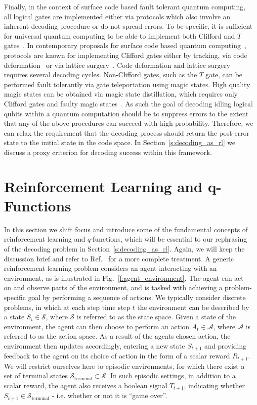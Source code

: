 \documentclass[twocolumn,preprintnumbers,amsmath,amssymb,notitlepage,nofootinbib,longbibliography,superscriptaddress,aps,pra,10pt]{revtex4-1}
\begin{document}
	Finally, in the context of surface code based fault tolerant quantum computing, all logical gates are implemented either via protocols which also involve an inherent decoding procedure or do not spread errors.
	To be specific, it is sufficient for universal quantum computing to be able to implement both Clifford and $T$ gates~\cite{Nebe01,Bravyi05}.
	In contemporary proposals for surface code based quantum computing~\cite{Litinski18b,Fowler18}, 
	protocols are known for implementing Clifford gates either by tracking, via code deformation~\cite{Brown17} or via lattice surgery~\cite{Horsman12,Litinski18}.
	Code deformation and lattice surgery requires several decoding cycles.
	Non-Clifford gates, such as the $T$ gate, can be performed fault tolerantly via gate teleportation using magic states.
	High quality magic states can be obtained via magic state distillation, which requires only Clifford gates and faulty magic states~\cite{Bravyi05}.
	As such the goal of decoding idling logical qubits within a quantum computation should be to suppress errors to the extent that any of the above procedures can succeed with high probability.
	Therefore, we can relax the requirement that the decoding process should return the post-error state to the initial state in the code space.
	In Section~\ref{s:decoding_as_rl} we discuss a proxy criterion for decoding success within this framework.

\section{Reinforcement Learning and q-Functions}\label{s:reinforcement_learning}

	In this section we shift focus and introduce some of the fundamental concepts of reinforcement learning and $q$-functions, which will be essential to our rephrasing of the decoding problem in Section~\ref{s:decoding_as_rl}.
	Again, we will keep the discussion brief and refer to Ref.~\cite{RLSutton18} for a more complete treatment.
	A generic reinforcement learning problem considers an agent interacting with an environment, as is illustrated in Fig.~\ref{f:agent_environment}.
	The agent can act on and observe parts of the environment, and is tasked with achieving a problem-specific goal by performing a sequence of actions.
	We typically consider discrete problems, in  which at each step time step $t$ the environment can be described by a state $S_t \in \mathcal{S}$, where $\mathcal{S}$ is referred to as the state space.
	Given a state of the environment, the agent can then choose to perform an action $A_t \in \mathcal{A}$, where $\mathcal{A}$ is referred to as the action space.
	As a result of the agents chosen action, the environment then updates accordingly, entering a new state $S_{t+1}$ and providing feedback to the agent on its choice of action in the form of a scalar reward $R_{t+1}$.
	We will restrict ourselves here to episodic environments, for which there exist a set of terminal states $\mathcal{S}_{\mathrm{terminal}} \subset \mathcal{S}$.
	In such episodic settings, in addition to a scalar reward, the agent also receives a boolean signal $T_{t+1}$, indicating whether $S_{t+1} \in \mathcal{S}_{\mathrm{terminal}} $ - i.e. whether or not it is ``game over''.
\end{document}
